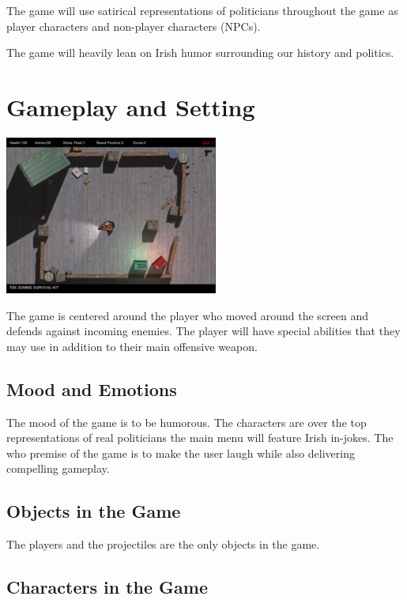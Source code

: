 \documentclass[a4paper]{scrreprt}
\begin{document}
\begin{flushleft}
The game will use satirical representations of politicians throughout the game as player characters and non-player characters (NPCs).
\end{flushleft}

\begin{flushleft}
The game will heavily lean on Irish humor surrounding our history and politics.
\end{flushleft}

\chapter{Gameplay and Setting}

\begin{center}
\includegraphics[width=7cm]{top-down}
\end{center}

The game is centered around the player who moved around the screen and defends against incoming enemies.
The player will have special abilities that they may use in addition to their main offensive weapon.

\section{Mood and Emotions}

The mood of the game is to be humorous.
The characters are over the top representations of real politicians the main menu will feature Irish in-jokes.
The who premise of the game is to make the user laugh while also delivering compelling gameplay.

\section{Objects in the Game}

The players and the projectiles are the only objects in the game.

\section{Characters in the Game}
\end{document}
